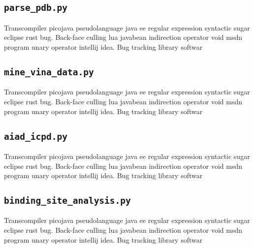 \subsection{\texttt{parse\_pdb.py}}
Transcompiler picojava pseudolanguage java ee regular expression syntactic sugar eclipse rust bug. Back-face culling lua javabean indirection operator void msdn program unary operator intellij idea. Bug tracking library softwar
% 

\subsection{\texttt{mine\_vina\_data.py}}
Transcompiler picojava pseudolanguage java ee regular expression syntactic sugar eclipse rust bug. Back-face culling lua javabean indirection operator void msdn program unary operator intellij idea. Bug tracking library softwar
% 

\subsection{\texttt{aiad\_icpd.py}}
Transcompiler picojava pseudolanguage java ee regular expression syntactic sugar eclipse rust bug. Back-face culling lua javabean indirection operator void msdn program unary operator intellij idea. Bug tracking library softwar
% 

\subsection{\texttt{binding\_site\_analysis.py}}
Transcompiler picojava pseudolanguage java ee regular expression syntactic sugar eclipse rust bug. Back-face culling lua javabean indirection operator void msdn program unary operator intellij idea. Bug tracking library softwar
% 

